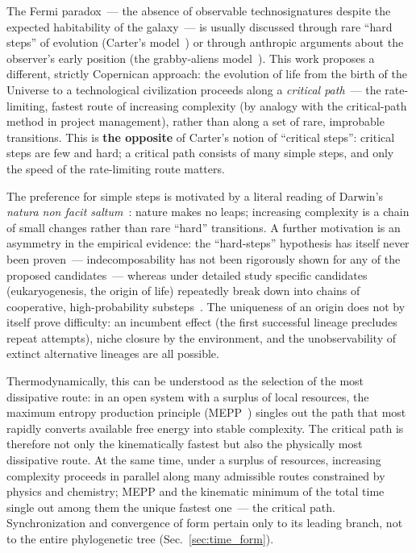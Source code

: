 \documentclass[11pt,a4paper]{article}
\begin{document}
The Fermi paradox~--- the absence of observable technosignatures despite the expected habitability of the galaxy~--- is usually discussed through rare ``hard steps'' of evolution (Carter's model~\cite{Carter1983}) or through anthropic arguments about the observer's early position (the grabby-aliens model~\cite{Hanson2021}). This work proposes a different, strictly Copernican approach: the evolution of life from the birth of the Universe to a technological civilization proceeds along a \emph{critical path}~--- the rate-limiting, fastest route of increasing complexity (by analogy with the critical-path method in project management), rather than along a set of rare, improbable transitions. This is \textbf{the opposite} of Carter's notion of ``critical steps'': critical steps are few and hard; a critical path consists of many simple steps, and only the speed of the rate-limiting route matters.

The preference for simple steps is motivated by a literal reading of Darwin's \emph{natura non facit saltum}~\cite{Darwin1859}: nature makes no leaps; increasing complexity is a chain of small changes rather than rare ``hard'' transitions. A further motivation is an asymmetry in the empirical evidence: the ``hard-steps'' hypothesis has itself never been proven~--- indecomposability has not been rigorously shown for any of the proposed candidates~--- whereas under detailed study specific candidates (eukaryogenesis, the origin of life) repeatedly break down into chains of cooperative, high-probability substeps~\cite{Mills2025}. The uniqueness of an origin does not by itself prove difficulty: an incumbent effect (the first successful lineage precludes repeat attempts), niche closure by the environment, and the unobservability of extinct alternative lineages are all possible.

Thermodynamically, this can be understood as the selection of the most dissipative route: in an open system with a surplus of local resources, the maximum entropy production principle (MEPP~\cite{Martyushev,MartyushevSeleznev2006,Kleidon2010,Vallino2010}) singles out the path that most rapidly converts available free energy into stable complexity. The critical path is therefore not only the kinematically fastest but also the physically most dissipative route. At the same time, under a surplus of resources, increasing complexity proceeds in parallel along many admissible routes constrained by physics and chemistry; MEPP and the kinematic minimum of the total time single out among them the unique fastest one~--- the critical path. Synchronization and convergence of form pertain only to its leading branch, not to the entire phylogenetic tree (Sec.~\ref{sec:time_form}).
\end{document}
